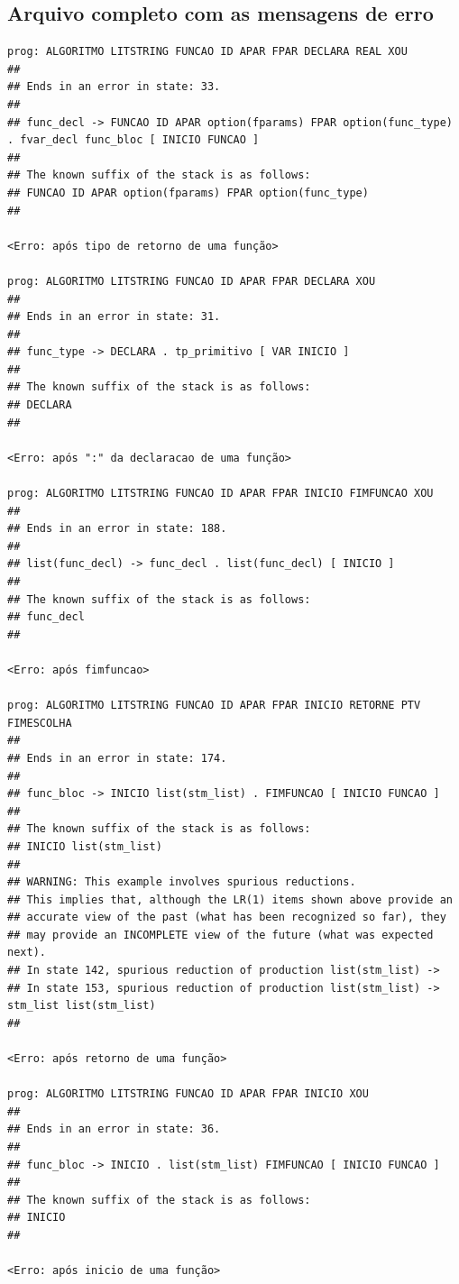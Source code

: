 \documentclass[hidelinks,12pt]{article}
\begin{document}
\subsection{Arquivo completo com as mensagens de erro}
\begin{lstlisting}
prog: ALGORITMO LITSTRING FUNCAO ID APAR FPAR DECLARA REAL XOU 
##
## Ends in an error in state: 33.
##
## func_decl -> FUNCAO ID APAR option(fparams) FPAR option(func_type) . fvar_decl func_bloc [ INICIO FUNCAO ]
##
## The known suffix of the stack is as follows:
## FUNCAO ID APAR option(fparams) FPAR option(func_type) 
##

<Erro: após tipo de retorno de uma função>

prog: ALGORITMO LITSTRING FUNCAO ID APAR FPAR DECLARA XOU 
##
## Ends in an error in state: 31.
##
## func_type -> DECLARA . tp_primitivo [ VAR INICIO ]
##
## The known suffix of the stack is as follows:
## DECLARA 
##

<Erro: após ":" da declaracao de uma função>

prog: ALGORITMO LITSTRING FUNCAO ID APAR FPAR INICIO FIMFUNCAO XOU 
##
## Ends in an error in state: 188.
##
## list(func_decl) -> func_decl . list(func_decl) [ INICIO ]
##
## The known suffix of the stack is as follows:
## func_decl 
##

<Erro: após fimfuncao>

prog: ALGORITMO LITSTRING FUNCAO ID APAR FPAR INICIO RETORNE PTV FIMESCOLHA 
##
## Ends in an error in state: 174.
##
## func_bloc -> INICIO list(stm_list) . FIMFUNCAO [ INICIO FUNCAO ]
##
## The known suffix of the stack is as follows:
## INICIO list(stm_list) 
##
## WARNING: This example involves spurious reductions.
## This implies that, although the LR(1) items shown above provide an
## accurate view of the past (what has been recognized so far), they
## may provide an INCOMPLETE view of the future (what was expected next).
## In state 142, spurious reduction of production list(stm_list) -> 
## In state 153, spurious reduction of production list(stm_list) -> stm_list list(stm_list) 
##

<Erro: após retorno de uma função>

prog: ALGORITMO LITSTRING FUNCAO ID APAR FPAR INICIO XOU 
##
## Ends in an error in state: 36.
##
## func_bloc -> INICIO . list(stm_list) FIMFUNCAO [ INICIO FUNCAO ]
##
## The known suffix of the stack is as follows:
## INICIO 
##

<Erro: após inicio de uma função>


\end{lstlisting}
\end{document}
